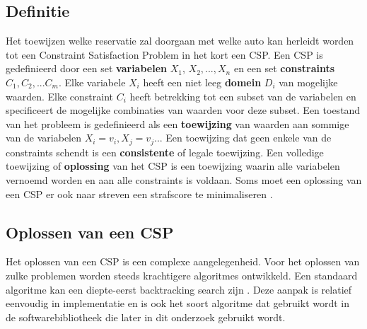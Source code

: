 \subsection{Definitie}
Het toewijzen welke reservatie zal doorgaan met welke auto kan herleidt worden tot een Constraint Satisfaction Problem in het kort een CSP. Een CSP is gedefinieerd door een set \textbf{variabelen} $X_{1}$, $X_{2},...,X_{n}$ en een set \textbf{constraints} $C_{1}, C_{2},...C_{m}$. Elke variabele $X_{i}$ heeft een niet leeg \textbf{domein} $D_{i}$ van mogelijke waarden. Elke constraint $C_{i}$ heeft betrekking tot een subset van de variabelen en specificeert de mogelijke combinaties van waarden voor deze subset. Een toestand van het probleem is gedefinieerd als een \textbf{toewijzing} van waarden aan sommige van de variabelen $X_{i} =  v_{i}, X_{j} = v_{j}$... Een toewijzing dat geen enkele van de constraints schendt is een \textbf{consistente} of legale toewijzing. Een volledige toewijzing of \textbf{oplossing} van het CSP is een toewijzing waarin alle variabelen vernoemd worden en aan alle constraints is voldaan. Soms moet een oplossing van een CSP er ook naar streven een strafscore te minimaliseren \autocite{norvig}.

\subsection{Oplossen van een CSP}
Het oplossen van een CSP is een complexe aangelegenheid. Voor het oplossen van zulke problemen worden steeds krachtigere algoritmes ontwikkeld. Een standaard algoritme kan een diepte-eerst backtracking search zijn \autocite{norvig}. Deze aanpak is relatief eenvoudig in implementatie en is ook het soort algoritme dat gebruikt wordt in de softwarebibliotheek die later in dit onderzoek gebruikt wordt.
